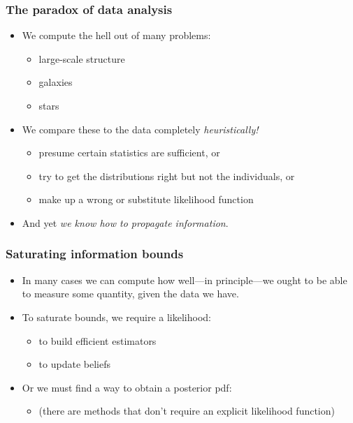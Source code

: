 \documentclass[pdftex]{beamer}
\begin{document}
\begin{frame}
  \frametitle{The paradox of data analysis}
  \begin{itemize}
  \item We compute the hell out of many problems:
    \begin{itemize}
    \item large-scale structure
    \item galaxies
    \item stars
    \end{itemize}
  \item We compare these to the data completely \emph{heuristically!}
    \begin{itemize}
    \item presume certain statistics are sufficient, or
    \item try to get the distributions right but not the individuals, or
    \item make up a wrong or substitute likelihood function
    \end{itemize}
  \item And yet \emph{we know how to propagate information}.
  \end{itemize}
\end{frame}

\begin{frame}
  \frametitle{Saturating information bounds}
  \begin{itemize}
  \item In many cases we can compute how well---in principle---we ought to be able to
    measure some quantity, given the data we have.
  \item To saturate bounds, we require a likelihood:
    \begin{itemize}
    \item to build efficient estimators
    \item to update beliefs
    \end{itemize}
  \item Or we must find a way to obtain a posterior pdf:
    \begin{itemize}
    \item (there are methods that don't require an explicit likelihood function)
    \end{itemize}
  \end{itemize}
\end{frame}
\end{document}
